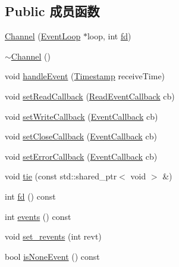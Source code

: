 \subsection*{Public 成员函数}
\begin{DoxyCompactItemize}
\item 
\hyperlink{classmuduo_1_1net_1_1Channel_a51d49371e765dcf30535b38b68bb80b6}{Channel} (\hyperlink{classmuduo_1_1net_1_1EventLoop}{Event\+Loop} $\ast$loop, int \hyperlink{classmuduo_1_1net_1_1Channel_ace5c4071ee8893901bb818bbcab739b2}{fd})
\item 
\hyperlink{classmuduo_1_1net_1_1Channel_aad279ec58dddf879ac20651fceffd4cf}{$\sim$\+Channel} ()
\item 
void \hyperlink{classmuduo_1_1net_1_1Channel_af59cb7c3df275e78794f431792feb4f1}{handle\+Event} (\hyperlink{classmuduo_1_1Timestamp}{Timestamp} receive\+Time)
\item 
void \hyperlink{classmuduo_1_1net_1_1Channel_a9c9db83b4fd2f185e645af0424e4b866}{set\+Read\+Callback} (\hyperlink{classmuduo_1_1net_1_1Channel_ae78e1c2582cc5d60cd1a4506851e8991}{Read\+Event\+Callback} cb)
\item 
void \hyperlink{classmuduo_1_1net_1_1Channel_af6eeca3ed6b8e2b223e8f190c17ff07b}{set\+Write\+Callback} (\hyperlink{classmuduo_1_1net_1_1Channel_aefcb94d55a02528f90f3aa028191dcb2}{Event\+Callback} cb)
\item 
void \hyperlink{classmuduo_1_1net_1_1Channel_af229f477bd6010da17ec7d7e1dc2ed47}{set\+Close\+Callback} (\hyperlink{classmuduo_1_1net_1_1Channel_aefcb94d55a02528f90f3aa028191dcb2}{Event\+Callback} cb)
\item 
void \hyperlink{classmuduo_1_1net_1_1Channel_a17cda71732ca56af17b9642d1bf268f2}{set\+Error\+Callback} (\hyperlink{classmuduo_1_1net_1_1Channel_aefcb94d55a02528f90f3aa028191dcb2}{Event\+Callback} cb)
\item 
void \hyperlink{classmuduo_1_1net_1_1Channel_a0cae1a626bb3d6d3bcd0ef59629ae94f}{tie} (const std\+::shared\+\_\+ptr$<$ void $>$ \&)
\item 
int \hyperlink{classmuduo_1_1net_1_1Channel_ace5c4071ee8893901bb818bbcab739b2}{fd} () const
\item 
int \hyperlink{classmuduo_1_1net_1_1Channel_ae4f693c8725a3c04d41dee8bb4266f7e}{events} () const
\item 
void \hyperlink{classmuduo_1_1net_1_1Channel_ac155f87f8dc6f7bdf9559d4d2e5a9a4b}{set\+\_\+revents} (int revt)
\item 
bool \hyperlink{classmuduo_1_1net_1_1Channel_af586af8cbcc49b563969f6c8356b3c9a}{is\+None\+Event} () const

\end{DoxyCompactItemize}
